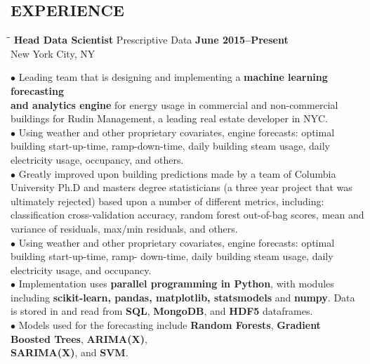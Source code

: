 \documentclass{resume}
\begin{document}
 
\address{ 
\href{mailto:david.karapetyan@gmail.com}{\nolinkurl{david.karapetyan@gmail.com}}
\\
\url{http://davidkarapetyan.com}}
\begin{resume}
\section{EXPERIENCE}
	\vspace{-0.05mm}

\begin{tabbing}
\hspace{2.3in}\= \hspace{2.6in}\= \kill
{\bf Head Data Scientist} \> Prescriptive Data   
\>\textbf{June 2015--Present } \\
    \>New York City, NY 
\end{tabbing}
$\bullet$
Leading team that is designing and implementing a \textbf{machine learning
forecasting \\ and analytics engine} for energy usage in commercial and non-commercial
buildings for Rudin Management, a leading real estate developer in NYC.  \\
$\bullet$ Using weather and other proprietary covariates, engine forecasts: optimal building start-up-time, ramp-down-time, 
daily building steam usage, daily electricity usage, occupancy, and others. \\
$\bullet$ 
Greatly improved upon building predictions made by a team of Columbia University
Ph.D and masters degree statisticians (a three year project that was ultimately
rejected) based upon a number of different metrics,
including: classification cross-validation accuracy, random forest out-of-bag
scores, mean and variance of residuals, max/min residuals, and others. \\
$\bullet$
Using weather and other proprietary covariates, engine forecasts: optimal building start-up-time, ramp-
down-time, daily building steam usage, daily electricity usage, and occupancy.
\\
$\bullet$
Implementation uses \textbf{parallel programming in Python}, 
with modules including \textbf{scikit-learn, pandas, matplotlib, statsmodels}
and \textbf{numpy}.
Data is stored in and read from \textbf{SQL}, \textbf{MongoDB}, and \textbf{HDF5} dataframes.\\
$\bullet$
Models used for the forecasting include \textbf{Random Forests}, \textbf{Gradient
Boosted Trees}, \textbf{ARIMA(X)}, \\ \textbf{SARIMA(X)}, and \textbf{SVM}. 

\end{resume}
\end{document}
